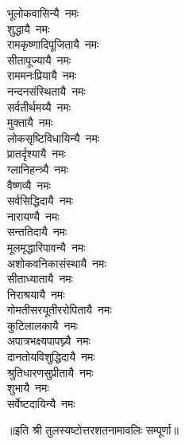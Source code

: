 \begin{multicols}{2}
\begin{flushleft}
भूलोकवासिन्यै~नमः\\
शुद्धायै~नमः\\
रामकृष्णादिपूजितायै~नमः\\
सीतापूज्यायै~नमः\\
राममनःप्रियायै~नमः\\
नन्दनसंस्थितायै~नमः\\
सर्वतीर्थमय्यै~नमः\\
मुक्तायै~नमः\hfill{}‌\\
लोकसृष्टिविधायिन्यै~नमः\\
प्रातर्दृश्यायै~नमः\\
ग्लानिहन्त्र्यै~नमः\\
वैष्णव्यै~नमः\\
सर्वसिद्धिदायै~नमः\\
नारायण्यै~नमः\\
सन्ततिदायै~नमः\\
मूलमृद्धारिपावन्यै~नमः\\
अशोकवनिकासंस्थायै~नमः\\
सीताध्यातायै~नमः\hfill{}‌\\
निराश्रयायै~नमः\\
गोमतीसरयूतीररोपितायै~नमः\\
कुटिलालकायै~नमः\\
अपात्रभक्ष्यपापघ्न्यै~नमः\\
दानतोयविशुद्धिदायै~नमः\\
श्रुतिधारणसुप्रीतायै~नमः\\
शुभायै~नमः\\
सर्वेष्टदायिन्यै~नमः\hfill{}\\
\end{flushleft}
\end{multicols}
॥इति श्री तुलस्यष्टोत्तरशतनामावलिः सम्पूर्णा॥
